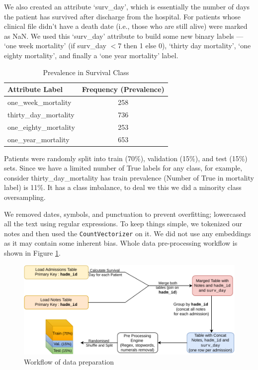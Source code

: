 \documentclass[11pt,a4paper]{article}
\begin{document}
We also created an attribute `surv\_day', which is essentially the number of days the patient has survived after discharge from the hospital. For patients whose clinical file didn't have a death date (i.e., those who are still alive) were marked as NaN. We used this `surv\_day' attribute to build some new binary labels --- `one week mortality' (if surv\_day $<$7 then 1 else 0), `thirty day mortality', `one eighty mortality', and finally a `one year mortality' label. 

\begin{table}[h!]
	\begin{center}
\begin{tabular}{lc}
	\hline
	\textbf{Attribute Label} & \textbf{Frequency (Prevalence)} \\
	\hline
	one\_week\_mortality	& 258 \\
	thirty\_day\_mortality	& 736 \\
	one\_eighty\_mortality	& 253  \\
	one\_year\_mortality	& 653 \\
	\hline %
\end{tabular}\end{center}
\caption{Prevalence in Survival Class}
\end{table}

Patients were randomly split into train (70\%), validation (15\%),
and test (15\%) sets. Since we have a limited number of True labels for any class, for example, consider thirty\_day\_mortality has train prevalence (Number of True in mortality label)  is 11\%. It has a class imbalance, to deal we this we did a minority class oversampling. 




We removed dates, symbols, and punctuation to prevent overfitting; lowercased all the text using regular expressions. To keep things simple, we tokenized our notes and then used the \texttt{CountVectorizer} on it. We did not use any embeddings as it may contain some inherent bias. Whole data pre-processing workflow is shown in Figure \ref{fig:hca-flow}.
\begin{figure}[h!]
	\centering
	\includegraphics[width=0.7\linewidth]{hca-flow}
	\caption{Workflow of data preparation}
	\label{fig:hca-flow}
\end{figure}
\end{document}
